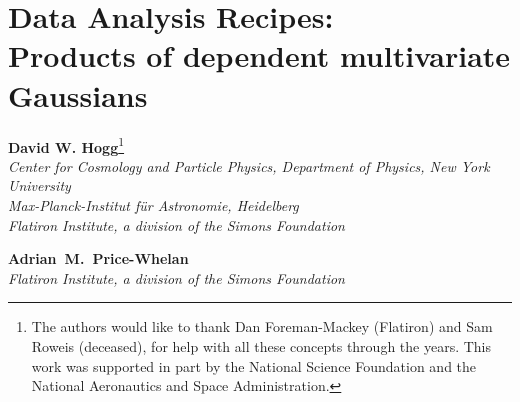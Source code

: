 \newcommand{\va}{\vector{a}}
\newcommand{\vb}{\vector{b}}
\newcommand{\vm}{\vector{m}}
\newcommand{\vx}{\vector{x}}
\newcommand{\vy}{\vector{y}}
\newcommand{\vz}{\vector{z}}
\newcommand{\vmu}{\vector{\mu}}
\newcommand{\veta}{\vector{\eta}}
\newcommand{\vtheta}{\vector{\theta}}
\newcommand{\tA}{\tensor{A}}
\newcommand{\tB}{\tensor{B}}
\newcommand{\tC}{\tensor{C}}
\newcommand{\tD}{\tensor{D}}
\newcommand{\tI}{\tensor{I}}
\newcommand{\tQ}{\tensor{Q}}
\newcommand{\tS}{\tensor{S}}
\newcommand{\tH}{\tensor{H}}
\newcommand{\tL}{\tensor{L}}
\newcommand{\tLambda}{\tensor{\Lambda}}
\newcommand{\mM}{\matrix{M}}
\newcommand{\mN}{\matrix{N}}
\newcommand{\mU}{\matrix{U}}
\newcommand{\mV}{\matrix{V}}
\newcommand{\bP}{\ensuremath{\textrm{\ding{80}}}} %
\newcommand{\bH}{\ensuremath{\textrm{\ding{114}}}} %

\addtolength{\topmargin}{-0.75in}
\addtolength{\textheight}{1.5in}
\setlength{\parindent}{\baselineskip}
\raggedbottom\sloppy\sloppypar\frenchspacing

\usepackage{color}
\newcommand{\todo}[1]{\textcolor{BrickRed}{[TODO: #1]}}
\newcommand{\bl}[1]{\textcolor{red}{[BL says: #1]}}
\newcommand{\hogg}[1]{\textcolor{magenta}{[Hogg says: #1]}}



\section*{Data Analysis Recipes:\\ Products of dependent multivariate Gaussians}

\noindent\textbf{David W. Hogg}\footnote{%
The authors would like to thank
  Dan Foreman-Mackey (Flatiron) and
  Sam Roweis (deceased),
for help with all these concepts through the years.
This work was supported in part by the National Science Foundation
and the National Aeronautics and Space Administration.
}\\
{\footnotesize%
  \textsl{Center for Cosmology and Particle Physics, Department of Physics, New York University}\\
  \textsl{Max-Planck-Institut f\"ur Astronomie, Heidelberg}\\
  \textsl{Flatiron Institute, a division of the Simons Foundation}%
}

\medskip\noindent\textbf{Adrian~M.~Price-Whelan}\\
{\footnotesize%
  \textsl{Flatiron Institute, a division of the Simons Foundation}%
}

